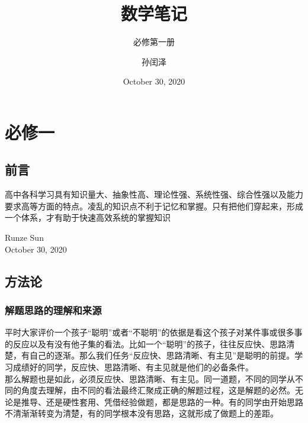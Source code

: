 \documentclass[lang=cn,11pt,chinese]{elegantbook}
\title{数学笔记}
\subtitle{必修第一册}
\author{孙闰泽}
\institute{山东省桓台第二中学}
\date{October 30, 2020}
\begin{document}
\maketitle
\frontmatter

\part{必修一}

\chapter*{前言}
高中各科学习具有知识量大、抽象性高、理论性强、系统性强、综合性强以及能力要求高等方面的特点。凌乱的知识点不利于记忆和掌握。只有把他们穿起来，形成一个体系，才有助于快速高效系统的掌握知识
\vskip 1.5cm

\begin{flushright}
Runze Sun\\
October 30, 2020
\end{flushright}

\tableofcontents

\mainmatter












\nocite{*} 

\appendix



\chapter{方法论}
\section{解题思路的理解和来源}
平时大家评价一个孩子“聪明”或者“不聪明”的依据是看这个孩子对某件事或很多事的反应以及有没有他子集的看法。比如一个“聪明”的孩子，往往反应快、思路清楚，有自己的逐渐。那么我们任务“反应快、思路清晰、有主见”是聪明的前提。学习成绩好的同学，反应快、思路清晰、有主见就是他们的必备条件。\\
那么解题也是如此，必须反应快、思路清晰、有主见。同一道题，不同的同学从不同的角度去理解，由不同的看法最终汇聚成正确的解题过程，这是解题的必然。无论是推导、还是硬性套用、凭借经验做题，都是思路的一种。有的同学由开始思路不清渐渐转变为清楚，有的同学根本没有思路，这就形成了做题上的差距。\\
\end{document}
